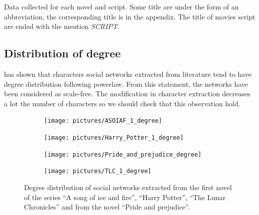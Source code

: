 \documentclass[a4paper, 12pt]{report}
\begin{document}
\begin{table}[]
\caption{Data collected for each novel and script. Some title are under the form of an abbreviation, the corresponding title
 is in the appendix. The title of movies script are ended with the mention \textit{SCRIPT}.}
 \label{signature}
\end{table}

\subsection{Distribution of degree}
\cite{original} has shown that characters social networks extracted from literature tend to have degree distribution following powerlaw. From this statement, the networks have been considered as scale-free. The modification in character extraction decreases a lot the number of characters so we should check that this observation hold.\\

\begin{figure}
\begin{subfigure}{.49\textwidth}
\centering
\texttt{[image: pictures/ASOIAF\_1\_degree]}
\end{subfigure}
\hfill
\begin{subfigure}{.49\textwidth}
\centering
\texttt{[image: pictures/Harry\_Potter\_1\_degree]}
\end{subfigure}
\hfill
\begin{subfigure}{.49\textwidth}
\centering
\texttt{[image: pictures/Pride\_and\_prejudice\_degree]}
\end{subfigure}
\begin{subfigure}{.49\textwidth}
\centering
\texttt{[image: pictures/TLC\_1\_degree]}
\end{subfigure}
\caption{Degree distribution of social networks extracted from the first novel of the series ``A song of ice and fire'', ``Harry Potter'', ``The Lunar Chronicles'' and from  the novel ``Pride and prejudice''.}
\label{distrib_degree_4_novels}
\end{figure}
\end{document}
